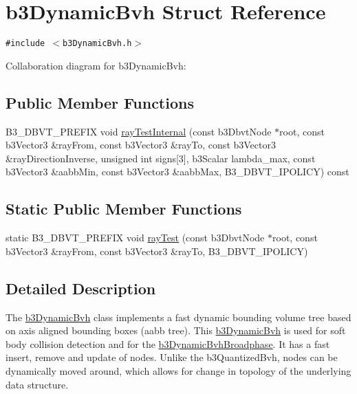 \hypertarget{structb3_dynamic_bvh}{
\section{b3DynamicBvh Struct Reference}
\label{structb3_dynamic_bvh}
}
{\tt \#include $<$b3DynamicBvh.h$>$}

Collaboration diagram for b3DynamicBvh:\subsection*{Public Member Functions}
\begin{CompactItemize}
\item 
B3\_\-DBVT\_\-PREFIX void \hyperlink{structb3_dynamic_bvh_164303efd5eac767e608b09526734b59}{rayTestInternal} (const b3DbvtNode $\ast$root, const b3Vector3 \&rayFrom, const b3Vector3 \&rayTo, const b3Vector3 \&rayDirectionInverse, unsigned int signs\mbox{[}3\mbox{]}, b3Scalar lambda\_\-max, const b3Vector3 \&aabbMin, const b3Vector3 \&aabbMax, B3\_\-DBVT\_\-IPOLICY) const 
\end{CompactItemize}
\subsection*{Static Public Member Functions}
\begin{CompactItemize}
\item 
static B3\_\-DBVT\_\-PREFIX void \hyperlink{structb3_dynamic_bvh_b913761020aef36751217a877fcf7e6d}{rayTest} (const b3DbvtNode $\ast$root, const b3Vector3 \&rayFrom, const b3Vector3 \&rayTo, B3\_\-DBVT\_\-IPOLICY)
\end{CompactItemize}


\subsection{Detailed Description}
The \hyperlink{structb3_dynamic_bvh}{b3DynamicBvh} class implements a fast dynamic bounding volume tree based on axis aligned bounding boxes (aabb tree). This \hyperlink{structb3_dynamic_bvh}{b3DynamicBvh} is used for soft body collision detection and for the \hyperlink{structb3_dynamic_bvh_broadphase}{b3DynamicBvhBroadphase}. It has a fast insert, remove and update of nodes. Unlike the b3QuantizedBvh, nodes can be dynamically moved around, which allows for change in topology of the underlying data structure. 

